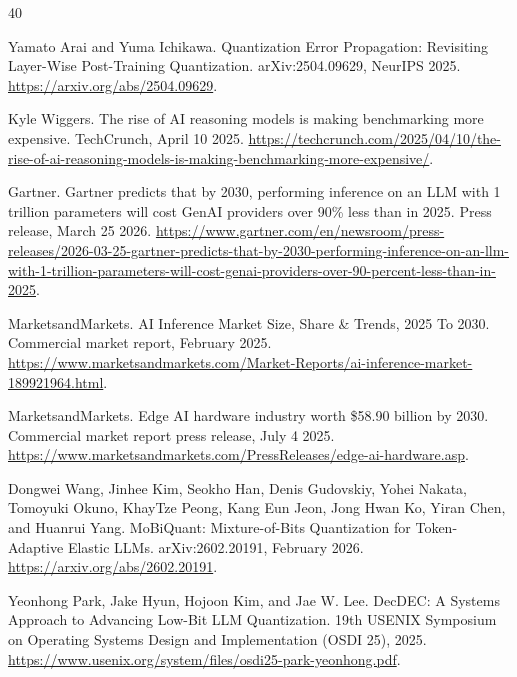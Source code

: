 \documentclass{article}
\begin{document}
\begin{thebibliography}{40}

Yamato Arai and Yuma Ichikawa.
\newblock Quantization Error Propagation: Revisiting Layer-Wise
Post-Training Quantization.
\newblock arXiv:2504.09629, NeurIPS 2025.
\newblock \url{https://arxiv.org/abs/2504.09629}.

Kyle Wiggers.
\newblock The rise of AI reasoning models is making benchmarking more
expensive.
\newblock TechCrunch, April 10 2025.
\newblock \url{https://techcrunch.com/2025/04/10/the-rise-of-ai-reasoning-models-is-making-benchmarking-more-expensive/}.

Gartner.
\newblock Gartner predicts that by 2030, performing inference on an LLM with
1 trillion parameters will cost GenAI providers over 90\% less than in 2025.
\newblock Press release, March 25 2026.
\newblock \url{https://www.gartner.com/en/newsroom/press-releases/2026-03-25-gartner-predicts-that-by-2030-performing-inference-on-an-llm-with-1-trillion-parameters-will-cost-genai-providers-over-90-percent-less-than-in-2025}.

MarketsandMarkets.
\newblock AI Inference Market Size, Share \& Trends, 2025 To 2030.
\newblock Commercial market report, February 2025.
\newblock \url{https://www.marketsandmarkets.com/Market-Reports/ai-inference-market-189921964.html}.

MarketsandMarkets.
\newblock Edge AI hardware industry worth \$58.90 billion by 2030.
\newblock Commercial market report press release, July 4 2025.
\newblock \url{https://www.marketsandmarkets.com/PressReleases/edge-ai-hardware.asp}.

Dongwei Wang, Jinhee Kim, Seokho Han, Denis Gudovskiy, Yohei Nakata,
Tomoyuki Okuno, KhayTze Peong, Kang Eun Jeon, Jong Hwan Ko, Yiran Chen, and
Huanrui Yang.
\newblock MoBiQuant: Mixture-of-Bits Quantization for Token-Adaptive Elastic
LLMs.
\newblock arXiv:2602.20191, February 2026.
\newblock \url{https://arxiv.org/abs/2602.20191}.

Yeonhong Park, Jake Hyun, Hojoon Kim, and Jae W. Lee.
\newblock DecDEC: A Systems Approach to Advancing Low-Bit LLM Quantization.
\newblock 19th USENIX Symposium on Operating Systems Design and
Implementation (OSDI 25), 2025.
\newblock \url{https://www.usenix.org/system/files/osdi25-park-yeonhong.pdf}.


\end{thebibliography}
\end{document}
